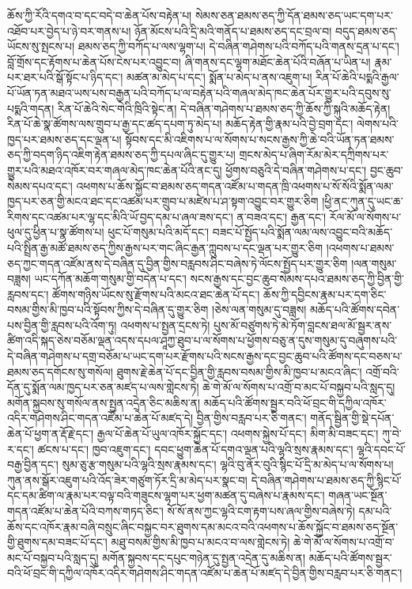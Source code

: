 ཆོས་ཀྱི་རོའི་དགའ་བ་དང་བདེ་བ་ཆེན་པོས་བརྟེན་པ། སེམས་ཅན་ཐམས་ཅད་ཀྱི་དོན་ཐམས་ཅད་ཡང་དག་པར་འཐོབ་པར་བྱེད་པ་ཉེ་བར་གནས་པ། ཉོན་མོངས་པའི་དྲི་མའི་གནོད་པ་ཐམས་ཅད་དང་བྲལ་བ། བདུད་ཐམས་ཅད་ཡོངས་སུ་སྤངས་པ། ཐམས་ཅད་ཀྱི་བཀོད་པ་ལས་ལྷག་པ། དེ་བཞིན་གཤེགས་པའི་བཀོད་པའི་གནས་དྲན་པ་དང་། བློ་གྲོས་དང་རྟོགས་པ་ཆེན་པོས་ངེས་པར་འབྱུང་བ། ཞི་གནས་དང་ལྷག་མཐོང་ཆེན་པོའི་བཞོན་པ་ཡིན་པ། རྣམ་པར་ཐར་པའི་སྒོ་སྟོང་པ་ཉིད་དང་། མཚན་མ་མེད་པ་དང་། སྨོན་པ་མེད་པ་ནས་འཇུག་པ། རིན་པོ་ཆེའི་པདྨའི་རྒྱལ་པོ་ཡོན་ཏན་མཐའ་ཡས་པས་བརྒྱན་པའི་བཀོད་པ་ལ་བརྟེན་པའི་གཞལ་མེད་ཁང་ཆེན་པོར་གྱུར་པའི་དབུས་སུ་པདྨའི་གདན། རིན་པོ་ཆེའི་སེང་གེའི་ཁྲིའི་སྟེང་ན། དེ་བཞིན་གཤེགས་པ་ཐམས་ཅད་ཀྱི་ཆོས་ཀྱི་སྐུའི་མཆོད་རྟེན། རིན་པོ་ཆེ་སྣ་ཚོགས་ལས་གྲུབ་པ་རྒྱ་དང་ཚད་དཔག་ཏུ་མེད་པ། མཆོད་རྟེན་གྱི་རྣམ་པའི་བྱེ་བྲག་དང་། ལེགས་པའི་ཁྱད་པར་ཐམས་ཅད་དང་ལྡན་པ། སྟོབས་དང་མི་འཇིགས་པ་ལ་སོགས་པ་སངས་རྒྱས་ཀྱི་ཆེ་བའི་ཡོན་ཏན་ཐམས་ཅད་ཀྱི་བདག་ཉིད་འཇིག་རྟེན་ཐམས་ཅད་ཀྱི་དཔལ་ཞིང་དུ་གྱུར་པ། གྲངས་མེད་པ་ཞིག་རོམ་མེར་དཀྲིགས་པར་གྱུར་པའི་མཐའ་འཁོར་བར་གཞལ་མེད་ཁང་ཆེན་པོའི་ནང་དུ། ཕྱོགས་བཅུའི་དེ་བཞིན་གཤེགས་པ་དང་། བྱང་ཆུབ་སེམས་དཔའ་དང་། འཕགས་པ་ཆོས་སྐྱོང་བ་ཐམས་ཅད་གདན་འཛོམ་པ་གདན་ཁྲི་འཕགས་པ་སོ་སོའི་སྨོན་ལམ་ཁྱད་པར་ཅན་གྱི་མངའ་ཐང་དང་འཚམ་པར་གྲུབ་པ་མཛེས་པ་ཤ་སྟག་འབྱུང་བར་གྱུར་ཅིག །ཕྱི་ནང་ཀུན་དུ་ཡང་ཆ་རིགས་དང་འཚམ་པར་ལྷ་དང་མིའི་ཡོ་བྱད་དམ་པ་ཞལ་ཟས་དང་། ན་བཟའ་དང་། རྒྱན་དང་། རོལ་མོ་ལ་སོགས་པ་ཕུལ་དུ་ཕྱིན་པ་སྣ་ཚོགས་པ། ཕུང་པོ་གསུམ་པའི་མདོ་དང་། བཟང་པོ་སྤྱོད་པའི་སྨོན་ལམ་ལས་འབྱུང་བའི་མཆོད་པའི་སྤྲིན་རྒྱ་མཚོ་ཐམས་ཅད་ཀྱིས་རྒྱས་པར་གང་ཞིང་རྒྱན་ཀླུབས་པ་དང་ལྡན་པར་གྱུར་ཅིག །འཕགས་པ་ཐམས་ཅད་ཀྱང་གདན་འཛོམ་ནས་དེ་བཞིན་དུ་བྱིན་གྱིས་བརླབས་ཤིང་བཞེས་ཏེ་ལོངས་སྤྱོད་པར་གྱུར་ཅིག །ལན་གསུམ་བཟླས། ཡང་དཀོན་མཆོག་གསུམ་གྱི་བདེན་པ་དང་། སངས་རྒྱས་དང་བྱང་ཆུབ་སེམས་དཔའ་ཐམས་ཅད་ཀྱི་བྱིན་གྱི་རླབས་དང་། ཚོགས་གཉིས་ཡོངས་སུ་རྫོགས་པའི་མངའ་ཐང་ཆེན་པོ་དང་། ཆོས་ཀྱི་དབྱིངས་རྣམ་པར་དག་ཅིང་བསམ་གྱིས་མི་ཁྱབ་པའི་སྟོབས་ཀྱིས་དེ་བཞིན་དུ་གྱུར་ཅིག །ཅེས་ལན་གསུམ་དུ་བཟླས། མཆོད་པའི་ཚོགས་དབེན་པས་བྱིན་གྱི་རླབས་པའི་འོག་ཏུ། འཕགས་པ་སྤྱན་དྲངས་ཏེ། པུས་མོ་བཙུགས་ཏེ་མེ་ཏོག་བླངས་ཐལ་མོ་སྦྱར་ནས་ཚིག་འདི་སྐད་ཅེས་བཅོམ་ལྡན་འདས་དཔལ་ཤཱཀྱ་ཐུབ་པ་ལ་སོགས་པ་ཕྱོགས་བཅུ་ན་དུས་གསུམ་དུ་བཞུགས་པའི་དེ་བཞིན་གཤེགས་པ་དགྲ་བཅོམ་པ་ཡང་དག་པར་རྫོགས་པའི་སངས་རྒྱས་དང་བྱང་ཆུབ་པའི་ཚོགས་དང་བཅས་པ་ཐམས་ཅད་དགོངས་སུ་གསོལ། ཐུགས་རྗེ་ཆེན་པོ་དང་བྱིན་གྱི་རླབས་བསམ་གྱིས་མི་ཁྱབ་པ་མངའ་ཞིང་། འགྲོ་བའི་དོན་དུ་སྨོན་ལམ་ཁྱད་པར་ཅན་མཛད་པ་ལས་གླེངས་ཏེ། ཆེ་གེ་མོ་ལ་སོགས་པ་འགྲོ་བ་མང་པོ་བསྐྱབ་པའི་སླད་དུ། མགོན་སྐྱབས་སུ་གསོལ་ནས་སྤྱན་འདྲེན་ཅིང་མཆིས་ན། མཆོད་པའི་ཚོགས་སྦྱར་བའི་ཕོ་བྲང་གི་དཀྱིལ་འཁོར་འདིར་གཤེགས་ཤིང་གདན་འཛོམ་པ་ཆེན་པོ་མཛད་དེ། བྱིན་གྱིས་བརླབ་པར་ཅི་གནང་། གནོད་སྦྱིན་གྱི་སྡེ་དཔོན་ཆེན་པོ་ཕྱག་ན་རྡོ་རྗེ་དང་། རྒྱལ་པོ་ཆེན་པོ་ཡུལ་འཁོར་སྐྱོང་དང་། འཕགས་སྐྱེས་པོ་དང་། མིག་མི་བཟང་དང་། ཀུ་བེ་ར་དང་། ཚངས་པ་དང་། ཁྱབ་འཇུག་དང་། དབང་ཕྱུག་ཆེན་པོ་དགའ་ལྡན་པའི་ལྷའི་སྲས་རྣམས་དང་། ལྷའི་དབང་པོ་བརྒྱ་བྱིན་དང་། སུམ་ཅུ་རྩ་གསུམ་པའི་ལྷའི་སྲས་རྣམས་དང་། ལྷའི་བུ་ནོར་བུའི་སྙིང་པོ་དྲི་མ་མེད་པ་ལ་སོགས་པ། ཀུན་ནས་སྒོར་འཇུག་པའི་འོད་ཟེར་གཙུག་ཏོར་དྲི་མ་མེད་པར་སྣང་བ། དེ་བཞིན་གཤེགས་པ་ཐམས་ཅད་ཀྱི་སྙིང་པོ་དང་དམ་ཚིག་ལ་རྣམ་པར་བལྟ་བའི་གཟུངས་ལྷག་པར་ཕྱག་མཚན་དུ་བཞེས་པ་རྣམས་དང་། གཞན་ཡང་སྔོན་གདན་འཛོམ་པ་ཆེན་པོའི་བཀས་གཏད་ཅིང་། སོ་སོ་ནས་ཀྱང་ལྷའི་ངག་རྟག་པས་ཞལ་གྱིས་བཞེས་ཏེ། དམ་པའི་ཆོས་དང་འཁོར་རྣམ་བཞི་བསྲུང་ཞིང་བསྐྱང་བར་ཐུགས་དམ་མངའ་བའི་འཕགས་པ་ཆོས་སྐྱོང་བ་ཐམས་ཅད་སྔོན་གྱི་ཐུགས་དམ་བཟང་པོ་དང་། མཐུ་བསམ་གྱིས་མི་ཁྱབ་པ་མངའ་བ་ལས་གླེངས་ཏེ། ཆེ་གེ་མོ་ལ་སོགས་པ་འགྲོ་བ་མང་པོ་བསྐྱབ་པའི་སླད་དུ། མགོན་སྐྱབས་དང་དཔུང་གཉེན་དུ་སྤྱན་འདྲེན་དུ་མཆིས་ན། མཆོད་པའི་ཚོགས་སྦྱར་བའི་ཕོ་བྲང་གི་དཀྱིལ་འཁོར་འདིར་གཤེགས་ཤིང་གདན་འཛོམ་པ་ཆེན་པོ་མཛད་དེ་བྱིན་གྱིས་བརླབ་པར་ཅི་གནང་། 